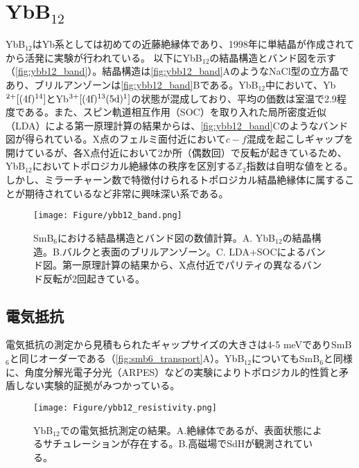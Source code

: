 \clearpage
\section{YbB\texorpdfstring{$_{12}$}{Lg}}
YbB$_{12}$はYb系としては初めての近藤絶縁体であり、1998年に単結晶が作成されてから活発に実験が行われている\cite{IGA1998337}。
以下にYbB$_{12}$の結晶構造とバンド図を示す\cite{ybb12_band}（\autoref{fig:ybb12_band}）。結晶構造は\autoref{fig:ybb12_band}AのようなNaCl型の立方晶であり、ブリルアンゾーンは\autoref{fig:ybb12_band}Bである。YbB$_{12}$中において、Yb$^{2+}[(4\rm{f})^{14}]$とYb$^{3+}[(4\rm{f})^{13}(5\rm{d})^1]$の状態が混成しており、平均の価数は室温で2.9程度である\cite{ybb12_valence}。また、スピン軌道相互作用（SOC）を取り入れた局所密度近似（LDA）による第一原理計算の結果からは、\autoref{fig:ybb12_band}Cのようなバンド図が得られている。X点のフェルミ面付近において$c-f$混成を起こしギャップを開けているが、各X点付近において2か所（偶数回）で反転が起きているため、YbB$_{12}$においてトポロジカル絶縁体の秩序を区別する$\mathbb{Z}_2$指数は自明な値をとる。しかし、ミラーチャーン数で特徴付けられるトポロジカル結晶絶縁体に属することが期待されているなど非常に興味深い系である\cite{ybb12_band}。
\begin{figure*}[!thb]
	\begin{center}
		\texttt{[image: Figure/ybb12\_band.png]}
\caption{SmB$_6$における結晶構造とバンド図の数値計算\cite{ybb12_band}。A. YbB$_{12}$の結晶構造。B.バルクと表面のブリルアンゾーン。C. LDA+SOCによるバンド図。第一原理計算の結果から、X点付近でパリティの異なるバンド反転が2回起きている。}
\label{fig:ybb12_band}
    \end{center}
\end{figure*}

\subsection{電気抵抗}
電気抵抗の測定から見積もられたギャップサイズの大きさは4-5 meVでありSmB$_6$と同じオーダーである（\autoref{fig:smb6_transport}A）。YbB$_{12}$についてもSmB$_6$と同様に、角度分解光電子分光（ARPES）などの実験によりトポロジカル的性質と矛盾しない実験的証拠がみつかっている\cite{ybb12_ALPES}。

\begin{figure*}[!thb]
	\begin{center}
		\texttt{[image: Figure/ybb12\_resistivity.png]}
\caption{YbB$_{12}$での電気抵抗測定の結果\cite{sato2019unconventional}。A.絶縁体であるが、表面状態によるサチュレーションが存在する。B.高磁場でSdHが観測されている。}
\label{fig:smb6_transport}
    \end{center}
\end{figure*}

